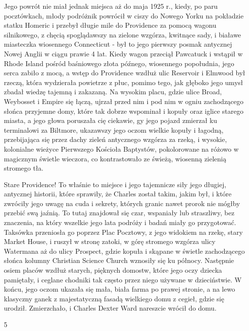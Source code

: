 Jego powrót nie miał jednak miejsca aż do maja 1925 r., kiedy, po paru pocztówkach, młody podróżnik powrócił w ciszy do Nowego Yorku na pokładzie statku Homeric i przebył długie mile do Providence za pomocą wagonu silnikowego, z chęcią spoglądawszy na zielone wzgórza, kwitnące sady, i białawe miasteczka wiosennego Connecticut - był to jego pierwszy posmak antycznej Nowej Anglii w ciągu prawie 4 lat. Kiedy wagon przeciął Pawcatuck i wstąpił w Rhode Island pośród baśniowego złota późnego, wiosennego popołudnia, jego serca zabiło z mocą, a wstęp do Providence wzdłuż ulic Reservoir i Elmwood był rzeczą, która wydzierała powietrze z płuc, pomimo tego, jak głęboko jego umysł zbadał wiedzę tajemną i zakazaną. Na wysokim placu, gdzie ulice Broad, Weybosset i Empire się łączą, ujrzał przed nim i pod nim w ogniu zachodzącego słońca przyjemne domy, które tak dobrze wspominał i kopuły oraz iglice starego miasta, a jego głowa poruszała cię ciekawie, gy jego pojazd zmierzał ku terminalowi za Biltmore, ukazawszy jego oczom wielkie kopuły i łagodną, przebijająca się przez dachy zieleń antycznego  wzgórza za rzeką, i wysokie, kolonialne wieżyce Pierwszego Kościoła Baptystów, pokolorowane na różowo w magicznym świetle wieczora, co kontrastowało ze świeżą, wiosenną zielenią stromego tła. 

Stare Providence! To właśnie to miejsce i jego tajemnicze siły jego długiej, antycznej historii, które sprawiły, że Charles został takim, jakim był, i które zwróciły jego uwagę na cuda i sekrety, których granic nawet prorok nie mógłby przebić swą jaźnią. To tutaj znajdował się czar, wspaniały lub straszliwy, bez znaczenia, na który wszelkie jego lata podróży i badań miały go przygotować. Taksówka przeniosła go poprzez Plac Pocztowy, z jego widokiem na rzekę, stary Market House, i ruszył w stronę zatoki, w górę stromego wzgórza ulicy Watermana aż do ulicy Prospect, gdzie kopuła i skąpane w świetle zachodzącego słońca kolumny Christian Science Church wznosiły się ku północy. Następnie osiem placów wzdłuż starych, pięknych domostw, które jego oczy dziecka pamiętały, i ceglane chodniki tak często przez niego używane w dzieciństwie. W końcu, jego oczom ukazała się mała, biała farma po prawej stronie, a na lewo klasyczny ganek z majestatyczną fasadą wielkiego domu z cegieł, gdzie się urodził. Zmierzchało, i Charles Dexter Ward nareszcie wrócił do domu. 

\begin{center}
5
\end{center}

